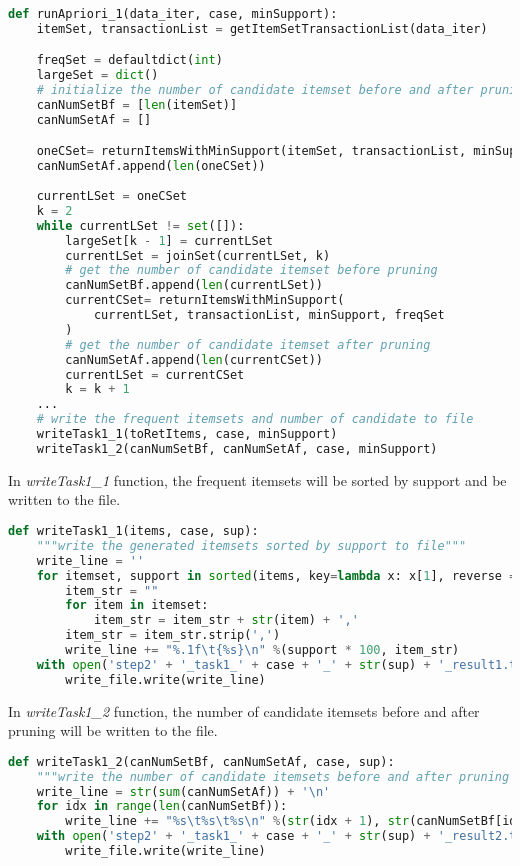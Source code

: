 \documentclass[a4paper, oneside, final, 12pt]{scrartcl} %
\begin{document}
\begin{lstlisting}[language=Python]
  def runApriori_1(data_iter, case, minSupport):
    itemSet, transactionList = getItemSetTransactionList(data_iter)

    freqSet = defaultdict(int)
    largeSet = dict()
    # initialize the number of candidate itemset before and after pruning
    canNumSetBf = [len(itemSet)]
    canNumSetAf = []

    oneCSet= returnItemsWithMinSupport(itemSet, transactionList, minSupport, freqSet)
    canNumSetAf.append(len(oneCSet))
    
    currentLSet = oneCSet
    k = 2
    while currentLSet != set([]):    
        largeSet[k - 1] = currentLSet
        currentLSet = joinSet(currentLSet, k)
        # get the number of candidate itemset before pruning
        canNumSetBf.append(len(currentLSet))
        currentCSet= returnItemsWithMinSupport(
            currentLSet, transactionList, minSupport, freqSet
        )
        # get the number of candidate itemset after pruning
        canNumSetAf.append(len(currentCSet))
        currentLSet = currentCSet
        k = k + 1
    ...
    # write the frequent itemsets and number of candidate to file
    writeTask1_1(toRetItems, case, minSupport)
    writeTask1_2(canNumSetBf, canNumSetAf, case, minSupport)
\end{lstlisting}

In \emph{writeTask1\_1} function, the frequent itemsets will be 
sorted by support and be written to the file.

\begin{lstlisting}[language=Python]
  def writeTask1_1(items, case, sup):
    """write the generated itemsets sorted by support to file"""
    write_line = ''
    for itemset, support in sorted(items, key=lambda x: x[1], reverse = True):
        item_str = ""
        for item in itemset:
            item_str = item_str + str(item) + ','
        item_str = item_str.strip(',')
        write_line += "%.1f\t{%s}\n" %(support * 100, item_str)
    with open('step2' + '_task1_' + case + '_' + str(sup) + '_result1.txt', mode = 'w') as write_file:
        write_file.write(write_line)
\end{lstlisting}

In \emph{writeTask1\_2} function, the number of candidate itemsets before and after pruning
will be written to the file.

\begin{lstlisting}[language=Python]
  def writeTask1_2(canNumSetBf, canNumSetAf, case, sup):
    """write the number of candidate itemsets before and after pruning to file"""
    write_line = str(sum(canNumSetAf)) + '\n'
    for idx in range(len(canNumSetBf)):
        write_line += "%s\t%s\t%s\n" %(str(idx + 1), str(canNumSetBf[idx]), str(canNumSetAf[idx]))
    with open('step2' + '_task1_' + case + '_' + str(sup) + '_result2.txt', mode = 'w') as write_file:
        write_file.write(write_line)
\end{lstlisting}
\end{document}
